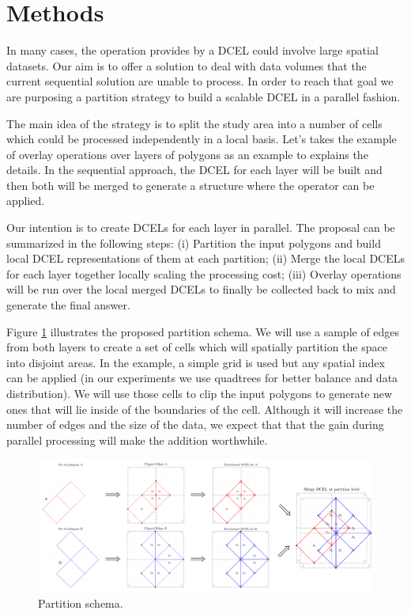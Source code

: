 \section{Methods}
In many cases, the operation provides by a DCEL could involve large spatial datasets.  Our aim is to offer a solution to deal with data volumes that the current sequential solution are unable to process.  In order to reach that goal we are purposing a partition strategy to build a scalable DCEL in a parallel fashion.  

The main idea of the strategy is to split the study area into a number of cells which could be processed independently in a local basis. Let's takes the example of overlay operations over layers of polygons as an example to explains the details. In the sequential approach, the DCEL for each layer will be built and then both will be merged to generate a structure where the operator can be applied.  

Our intention is to create DCELs for each layer in parallel.  The proposal can be summarized in the following steps: (i) Partition the input polygons and build local DCEL representations of them at each partition; (ii) Merge the local DCELs for each layer together locally scaling the processing cost; (iii) Overlay operations will be run over the local merged DCELs to finally be collected back to mix and generate the final answer.  

Figure \ref{fig:overlay_parted} illustrates the proposed partition schema.  We will use a sample of edges from both layers to create a set of cells which will spatially partition the space into disjoint areas.  In the example, a simple grid is used but any spatial index can be applied (in our experiments we use quadtrees for better balance and data distribution).  We will use those cells to clip the input polygons to generate new ones that will lie inside of the boundaries of the cell.  Although it will increase the number of edges and the size of the data, we expect that that the gain during parallel processing will make the addition worthwhile.

\begin{figure}[!ht]
    \centering
    \includegraphics[width=\textwidth]{figures/01-OverlayParted}
    \caption{Partition schema.}\label{fig:overlay_parted}
\end{figure}

